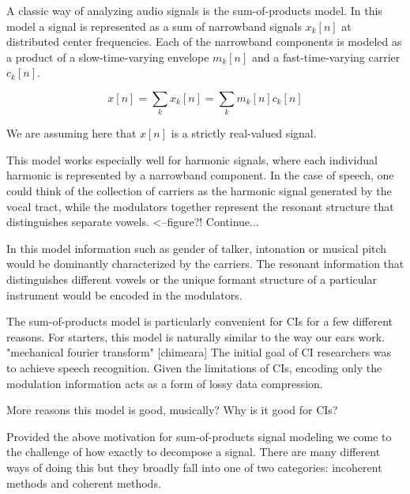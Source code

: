 \documentclass [11pt, proquest] {uwthesis}[2015/03/03]
\begin{document}
A classic way of analyzing audio signals is the sum-of-products model.  In this model a signal is represented as a sum of narrowband signals $x_k[n]$ at distributed center frequencies.  Each of the narrowband components is modeled as a product of a slow-time-varying envelope $m_k[n]$ and a fast-time-varying carrier $c_k[n]$.


\begin{equation}
\label{eq:sum-of-products}
x[n] = \sum\limits_k x_k[n] = \sum\limits_k m_k[n] c_k[n]
\end{equation}


We are assuming here that $x[n]$ is a strictly real-valued signal.

This model works especially well for harmonic signals, where each individual harmonic is represented by a narrowband component.  In the case of speech, one could think of the collection of carriers as the harmonic signal generated by the vocal tract, while the modulators together represent the resonant structure that distinguishes separate vowels. <--figure?!  Continue...

In this model information such as gender of talker, intonation or musical pitch would be dominantly characterized by the carriers.  The resonant information that distinguishes different vowels or the unique formant structure of a particular instrument would be encoded in the modulators.

The sum-of-products model is particularly convenient for CIs for a few different reasons. For starters, this model is naturally similar to the way our ears work. "mechanical fourier transform" [chimeara] The initial goal of CI researchers was to achieve speech recognition.  Given the limitations of CIs, encoding only the modulation information acts as a form of lossy data compression.

More reasons this model is good, musically?
Why is it good for CIs?

Provided the above motivation for sum-of-products signal modeling we come to the challenge of how exactly to decompose a signal.  There are many different ways of doing this but they broadly fall into one of two categories: incoherent methods and coherent methods.
\end{document}
